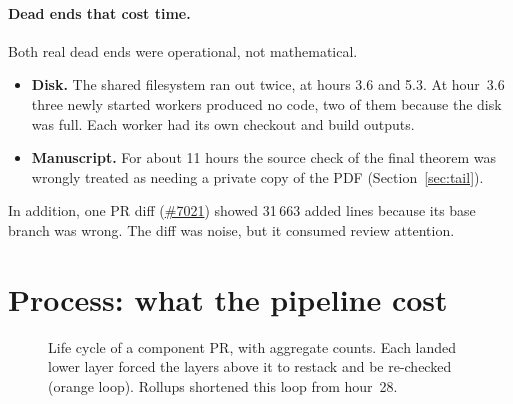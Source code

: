\documentclass[11pt]{article}
\newcommand{\pr}[1]{\href{https://github.com/cslib-community/cslib-frontier/pull/#1}{\##1}}
\begin{document}
\paragraph{Dead ends that cost time.} Both real dead ends were operational, not mathematical.
\begin{itemize}
\item \textbf{Disk.} The shared filesystem ran out twice, at hours 3.6 and 5.3. At hour~3.6 three
newly started workers produced no code, two of them because the disk was full. Each worker had its
own checkout and build outputs.
\item \textbf{Manuscript.} For about 11 hours the source check of the final theorem was wrongly
treated as needing a private copy of the PDF (Section~\ref{sec:tail}).
\end{itemize}
In addition, one PR diff (\pr{7021}) showed 31\,663 added lines because its base branch was wrong.
The diff was noise, but it consumed review attention.

\section{Process: what the pipeline cost}
\label{sec:process}

\begin{figure}[!htbp]
\centering
{}
\caption{Life cycle of a component PR, with aggregate counts. Each landed lower layer forced the
layers above it to restack and be re-checked (orange loop). Rollups shortened this loop from
hour~28.}
\label{fig:pipeline}
\end{figure}
\end{document}
